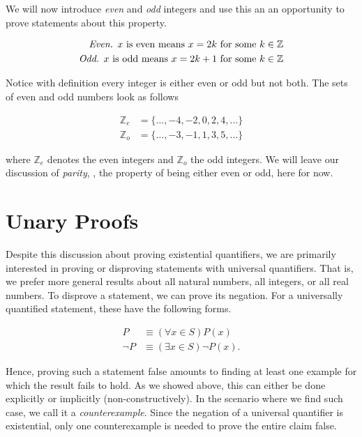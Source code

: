 \documentclass[twoside]{report}
\begin{document}
We will now introduce \emph{even} and \emph{odd} integers  and use this an an opportunity to prove statements about this property.

\begin{align*}
	\emph{Even. } x \text{ is even means } x = 2k \text{ for some } k \in \mathbb{Z} \\
	\emph{Odd. }x \text{ is odd means } x = 2k + 1 \text{ for some } k \in \mathbb{Z}
\end{align*}

Notice with definition every integer is either even or odd but not both. The sets of even and odd numbers look as follows

\begin{align*}
	\mathbb{Z}_e &= \{ \dots, -4, -2, 0, 2, 4, \dots \} \\
	\mathbb{Z}_o &= \{ \dots, -3, -1, 1, 3, 5, \dots \}
\end{align*}

where $\mathbb{Z}_e$ denotes the even integers and $\mathbb{Z}_o$ the odd integers. We will leave our discussion of \emph{parity}, , the property of being either even or odd, here for now.

\section{Unary Proofs}

Despite this discussion about proving existential quantifiers, we are primarily interested in proving or disproving statements with universal quantifiers. That is, we prefer more general results about all natural numbers, all integers, or all real numbers. To disprove a statement, we can prove its negation. For a universally quantified statement, these have the following forms.

\begin{align*}
	P &\equiv (\forall x \in S)P(x) \\
	\neg P &\equiv (\exists x \in S)\neg P(x).
\end{align*}

Hence, proving such a statement false amounts to finding at least one example for which the result fails to hold. As we showed above, this can either be done explicitly or implicitly (non-constructively). In the scenario where we find such case, we call it a \emph{counterexample}.  Since the negation of a universal quantifier is existential, only one counterexample is needed to prove the entire claim false.
\end{document}
